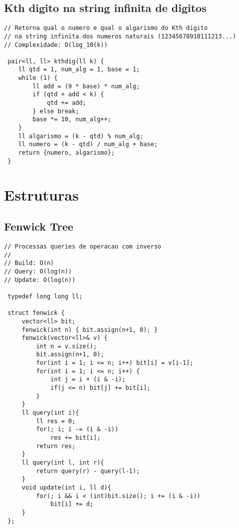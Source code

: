 \documentclass[11pt, a4paper, twoside]{article}
\begin{document}
\subsection{Kth digito na string infinita de digitos}
\begin{lstlisting}
// Retorna qual o numero e qual o algarismo do Kth digito
// na string infinita dos numeros naturais (12345678910111213...)
// Complexidade: O(log_10(k))

 pair<ll, ll> kthdig(ll k) {
 	ll qtd = 1, num_alg = 1, base = 1;
 	while (1) {
 		ll add = (9 * base) * num_alg;
 		if (qtd + add < k) {
 			qtd += add;
 		} else break;
 		base *= 10, num_alg++;
 	}
 	ll algarismo = (k - qtd) % num_alg;
 	ll numero = (k - qtd) / num_alg + base;
 	return {numero, algarismo};
 }
\end{lstlisting}

\clearpage


%
%

\section{Estruturas}

\subsection{Fenwick Tree}
\begin{lstlisting}
// Processas queries de operacao com inverso
//
// Build: O(n)
// Query: O(log(n))
// Update: O(log(n))

 typedef long long ll;
 
 struct fenwick {
     vector<ll> bit;
     fenwick(int n) { bit.assign(n+1, 0); }
     fenwick(vector<ll>& v) {
         int n = v.size();
         bit.assign(n+1, 0);
         for(int i = 1; i <= n; i++) bit[i] = v[i-1];
         for(int i = 1; i <= n; i++) {
             int j = i + (i & -i);
             if(j <= n) bit[j] += bit[i];
         }
     }
     ll query(int i){
         ll res = 0;
         for(; i; i -= (i & -i))
             res += bit[i];
         return res;
     }
     ll query(int l, int r){
         return query(r) - query(l-1);
     }
     void update(int i, ll d){
         for(; i && i < (int)bit.size(); i += (i & -i))
             bit[i] += d;
     }
 };
\end{lstlisting}
\end{document}
